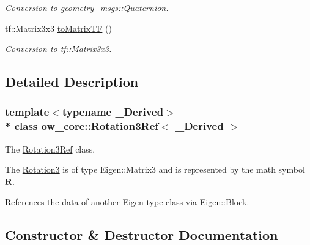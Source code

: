\begin{DoxyCompactItemize}
\begin{DoxyCompactList}\small\item\em Conversion to geometry\+\_\+msgs\+::\+Quaternion. \end{DoxyCompactList}\item 
tf\+::\+Matrix3x3 \hyperlink{classow__core_1_1Rotation3Ref_ae0f85728772cde3bd954e7b86a4a4f22}{to\+Matrix\+TF} ()\hypertarget{classow__core_1_1Rotation3Ref_ae0f85728772cde3bd954e7b86a4a4f22}{}\label{classow__core_1_1Rotation3Ref_ae0f85728772cde3bd954e7b86a4a4f22}

\begin{DoxyCompactList}\small\item\em Conversion to tf\+::\+Matrix3x3. \end{DoxyCompactList}\end{DoxyCompactItemize}


\subsection{Detailed Description}
\subsubsection*{template$<$typename \+\_\+\+Derived$>$\\*
class ow\+\_\+core\+::\+Rotation3\+Ref$<$ \+\_\+\+Derived $>$}

The \hyperlink{classow__core_1_1Rotation3Ref}{Rotation3\+Ref} class. 

The \hyperlink{classow__core_1_1Rotation3}{Rotation3} is of type Eigen\+::\+Matrix3 and is represented by the math symbol $\mathbf{R}$.

References the data of another Eigen type class via Eigen\+::\+Block. 

\subsection{Constructor \& Destructor Documentation}
